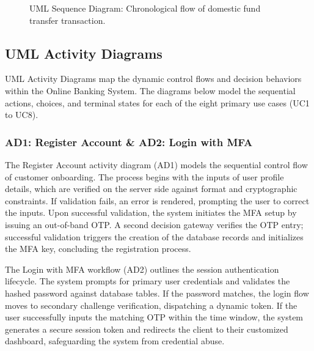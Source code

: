 \documentclass[11pt,a4paper]{article}
\begin{document}
\begin{figure}[H]
\caption{UML Sequence Diagram: Chronological flow of domestic fund transfer transaction.}
\label{fig:sequence}
\end{figure}

\newpage

\subsection{UML Activity Diagrams}
UML Activity Diagrams map the dynamic control flows and decision behaviors within the Online Banking System. The diagrams below model the sequential actions, choices, and terminal states for each of the eight primary use cases (UC1 to UC8).

\subsubsection{AD1: Register Account \& AD2: Login with MFA}
The Register Account activity diagram (AD1) models the sequential control flow of customer onboarding. The process begins with the inputs of user profile details, which are verified on the server side against format and cryptographic constraints. If validation fails, an error is rendered, prompting the user to correct the inputs. Upon successful validation, the system initiates the MFA setup by issuing an out-of-band OTP. A second decision gateway verifies the OTP entry; successful validation triggers the creation of the database records and initializes the MFA key, concluding the registration process.

The Login with MFA workflow (AD2) outlines the session authentication lifecycle. The system prompts for primary user credentials and validates the hashed password against database tables. If the password matches, the login flow moves to secondary challenge verification, dispatching a dynamic token. If the user successfully inputs the matching OTP within the time window, the system generates a secure session token and redirects the client to their customized dashboard, safeguarding the system from credential abuse.
\end{document}

